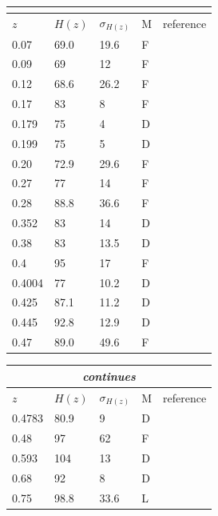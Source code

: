 \begin{table}[t!]
\begin{center}
\begin{tabular}{|llllr|}
\multicolumn{5}{c}{{}}\\
\hline \hline
$z$ & $H(z)$ & $\sigma_{H(z)}$ & M & reference\\
\hline
0.07 & 69.0 & 19.6 & F & \cite{zhang2014}\\
0.09 & 69 & 12 & F & \cite{simon2005}\\
0.12 & 68.6 & 26.2 & F & \cite{zhang2014}\\
0.17 & 83 & 8 & F & \cite{simon2005}\\
0.179 & 75 & 4 & D & \cite{moresco2012}\\
0.199 & 75 & 5 & D & \cite{moresco2012}\\
0.20 & 72.9 & 29.6 & F & \cite{zhang2014}\\
0.27 & 77 & 14 & F & \cite{simon2005}\\
0.28 & 88.8 & 36.6 & F & \cite{zhang2014}\\
0.352 & 83 & 14 & D & \cite{moresco2012}\\
0.38 & 83 & 13.5 & D & \cite{moresco2016}\\
0.4 & 95 & 17 & F & \cite{simon2005}\\
0.4004 & 77 & 10.2 & D & \cite{moresco2016}\\
0.425 & 87.1 & 11.2 & D & \cite{moresco2016}\\
0.445 & 92.8 & 12.9 & D & \cite{moresco2016}\\
0.47 & 89.0 & 49.6 & F & \cite{ratsimbazafy2017}\\
\hline \hline
\end{tabular}
\begin{tabular}{|llllr|}
\multicolumn{5}{c}{{\it continues}}\\
\hline \hline
$z$ & $H(z)$ & $\sigma_{H(z)}$ & M & reference\\
\hline
0.4783 & 80.9 & 9 & D & \cite{moresco2016}\\
0.48 & 97 & 62 & F & \cite{stern2010}\\
0.593 & 104 & 13 & D & \cite{moresco2012}\\
0.68 & 92 & 8 & D & \cite{moresco2012}\\
0.75 & 98.8 & 33.6 & L & \cite{borghi2021b}\\

\end{tabular}
\end{center}
\end{table}
